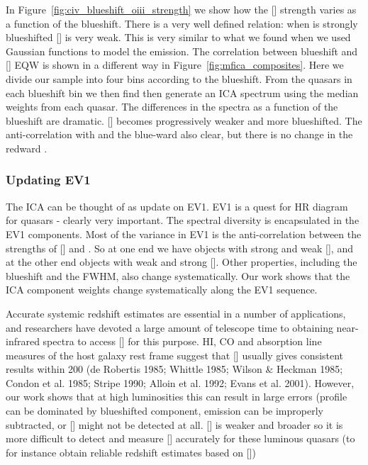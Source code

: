 In Figure~\ref{fig:civ_blueshift_oiii_strength} we show how the [] strength varies as a function of the  blueshift. 
There is a very well defined relation: when  is strongly blueshifted [] is very weak. 
This is very similar to what we found when we used Gaussian functions to model the emission. 
The correlation between  blueshift and [] EQW is shown in a different way in Figure~\ref{fig:mfica_composites}. 
Here we divide our sample into four bins according to the  blueshift. 
From the quasars in each  blueshift bin we then find then generate an ICA spectrum using the median weights from each quasar. 
The differences in the spectra as a function of the  blueshift are dramatic. 
[] becomes progressively weaker and more blueshifted.
The anti-correlation with  and the blue-ward  also clear, but there is no change in the redward . 

\subsubsection{Updating EV1}

The ICA can be thought of as update on EV1.
EV1 is a quest for HR diagram for quasars - clearly very important.  
The spectral diversity is encapsulated in the EV1 components. 
Most of the variance in EV1 is the anti-correlation between the strengths of [] and . 
So at one end we have objects with strong  and weak [], and at the other end objects with weak  and strong []. 
Other properties, including the  blueshift and the \hb FWHM, also change systematically. 
Our work shows that the ICA component weights change systematically along the EV1 sequence. 


Accurate systemic redshift estimates are essential in a number of applications, and researchers have devoted a large amount of telescope time to obtaining near-infrared spectra to access [] for this purpose. 
HI, CO and absorption line measures of the host galaxy rest frame suggest that [] usually gives consistent results within 200 \kms (de Robertis 1985; Whittle 1985; Wilson \& Heckman 1985; Condon et al. 1985; Stripe 1990; Alloin et al. 1992; Evans et al. 2001).  
However, our work shows that at high luminosities this can result in large errors (profile can be dominated by blueshifted component,  emission can be improperly subtracted, or [] might not be detected at all. 
[] is weaker and broader so it is more difficult to detect and measure [] accurately for these luminous quasars (to for instance obtain reliable redshift estimates based on [])

